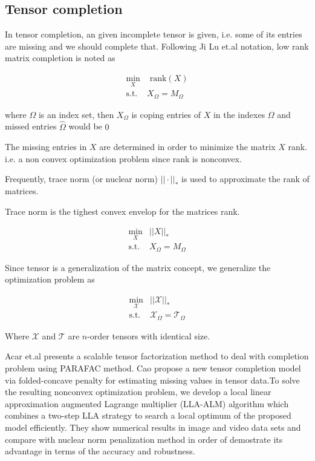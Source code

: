 \documentclass[letterpaper,12pt]{article}
\begin{document}
 \subsection{Tensor completion}
 
 In tensor completion, an given incomplete tensor is given, i.e. some of its entries are missing and we should complete that. Following Ji Lu et.al \cite{Liu2013} notation,  low rank matrix completion is noted as

\begin{equation} 
 \begin{split}
  \min_X & \text{ rank}(X)\\
  \text{s.t. } & X_\Omega = M_\Omega
 \end{split}
\end{equation}

where $\Omega$ is an index set, then $X_\Omega$ is coping entries of $X$ in the indexes $\Omega$ and missed entries $\hat{\Omega}$ would be $0$

The missing entries in $X$ are determined in order to minimize the matrix $X$ rank. i.e. a non convex optimization problem since rank is nonconvex.

Frequently, trace norm (or nuclear norm) $||\cdot ||_*$ is used to approximate the rank of matrices.

Trace norm is the tighest convex envelop for the matrices rank.

\begin{equation} 
 \begin{split}
  \min_X & ||X||_*\\
  \text{s.t. } & X_\Omega = M_\Omega
 \end{split}
\end{equation}

Since tensor is a generalization of the matrix concept, we generalize the  optimization problem as

\begin{equation} 
 \begin{split}
  \min_{\mathcal{X}} & ||\mathcal{X}||_*\\
  \text{s.t. } & \mathcal{X}_\Omega = \mathcal{T}_\Omega
 \end{split}
\end{equation}

Where $\mathcal{X}$ and $\mathcal{T}$ are $n$-order tensors with identical size.

Acar et.al \cite{Acar2011} presents a scalable tensor factorization method to deal with completion problem using PARAFAC method. Cao \cite{Cao2015} propose a new tensor completion model via folded-concave penalty for estimating missing values in tensor data.To solve the resulting nonconvex optimization problem, we develop a local linear approximation augmented Lagrange multiplier (LLA-ALM) algorithm which combines a two-step LLA strategy to search a local optimum of the proposed model efficiently. They show numerical results in image and video data sets and compare with nuclear norm penalization method in order of demostrate its advantage in terms of the accuracy and robustness.
\end{document}
